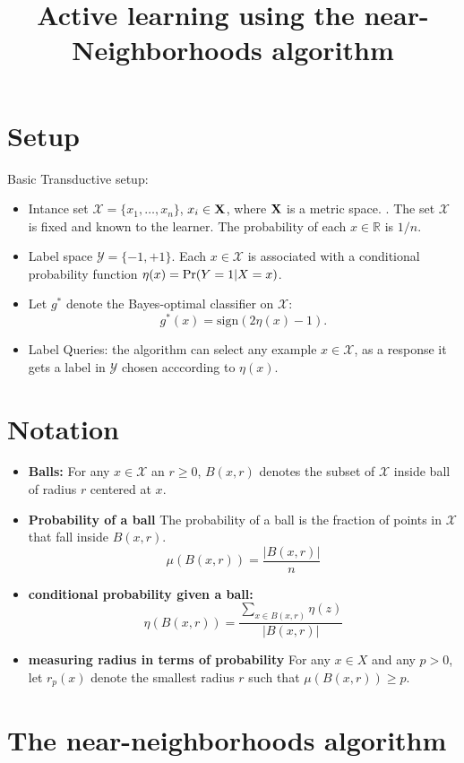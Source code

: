 \documentclass{article}
\title{Active learning using the near-Neighborhoods algorithm}
\def\R{{\mathbb{R}}}
\def\pr{{\rm Pr}}
\def\X{{\mathcal X}}
\def\Y{{\mathcal Y}}
\begin{document}
\maketitle

\section{Setup}

Basic Transductive setup:
\begin{itemize}
\item Intance set $\X =\{x_1,\dots,x_n\}$, $x_i \in {\bf X}$, where
  ${\bf X}$ is a metric space. . The set
  $\X$ is fixed and known to the learner. The probability of each $x
  \in \R$ is $1/n$.
\item Label space $\Y = \{-1,+1\}$. Each $x \in \X$ is associated with
  a conditional probability function $\eta(x) = \pr(Y=1|X=x)$.
\item Let $g^*$ denote the Bayes-optimal classifier on $\X$:
  $$ g^*(x) = \mbox{sign}(2 \eta(x) - 1) .$$
  \item Label Queries: the algorithm can select any example $x \in
    \X$, as a response it gets a label in $\Y$ chosen acccording to
    $\eta(x)$.    
  \end{itemize}

\section{Notation}
\begin{itemize}
\item {\bf Balls:} For any $x \in \X$ an $r\geq0$,
  $B(x,r)$ denotes the subset of $\X$ inside ball of radius $r$ centered at $x$.
  \item {\bf Probability of a ball} The probability of a ball is the
    fraction of points in $\X$ that fall inside $B(x,r)$.
    $$ \mu(B(x,r)) = \frac{ |B(x,r)|}{n}$$
  \item {\bf conditional probability given a ball:}
    $$ \eta(B(x,r)) = \frac{\sum_{x \in B(x,r)}\eta(z)}{|B(x,r)|}$$
  \item {\bf measuring radius in terms of probability}
For any $x \in X$ and any $p > 0$, let $r_p(x)$ denote the smallest
radius $r$ such that $\mu(B(x, r)) \geq p$.
\end{itemize}

\section{The near-neighborhoods algorithm}
\end{document}
